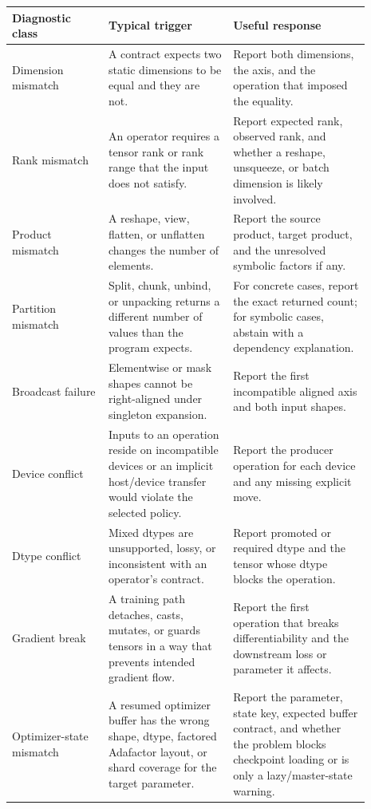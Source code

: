 \documentclass[11pt]{article}
\begin{document}
\begin{longtable}{|p{0.24\linewidth}|p{0.31\linewidth}|p{0.34\linewidth}|}
\hline
\textbf{Diagnostic class} & \textbf{Typical trigger} & \textbf{Useful response} \\
\hline
Dimension mismatch & A contract expects two static dimensions to be equal and
they are not. & Report both dimensions, the axis, and the operation that imposed
the equality. \\
\hline
Rank mismatch & An operator requires a tensor rank or rank range that the input
does not satisfy. & Report expected rank, observed rank, and whether a reshape,
unsqueeze, or batch dimension is likely involved. \\
\hline
Product mismatch & A reshape, view, flatten, or unflatten changes the number of
elements. & Report the source product, target product, and the unresolved
symbolic factors if any. \\
\hline
Partition mismatch & Split, chunk, unbind, or unpacking returns a different
number of values than the program expects. & For concrete cases, report the
exact returned count; for symbolic cases, abstain with a dependency explanation. \\
\hline
Broadcast failure & Elementwise or mask shapes cannot be right-aligned under
singleton expansion. & Report the first incompatible aligned axis and both input
shapes. \\
\hline
Device conflict & Inputs to an operation reside on incompatible devices or an
implicit host/device transfer would violate the selected policy. & Report the
producer operation for each device and any missing explicit move. \\
\hline
Dtype conflict & Mixed dtypes are unsupported, lossy, or inconsistent with an
operator's contract. & Report promoted or required dtype and the tensor whose
dtype blocks the operation. \\
\hline
Gradient break & A training path detaches, casts, mutates, or guards tensors in a
way that prevents intended gradient flow. & Report the first operation that
breaks differentiability and the downstream loss or parameter it affects. \\
\hline
Optimizer-state mismatch & A resumed optimizer buffer has the wrong shape, dtype,
factored Adafactor layout, or shard coverage for the target parameter. & Report
the parameter, state key, expected buffer contract, and whether the problem blocks
checkpoint loading or is only a lazy/master-state warning. \\
\hline

\end{longtable}
\end{document}
